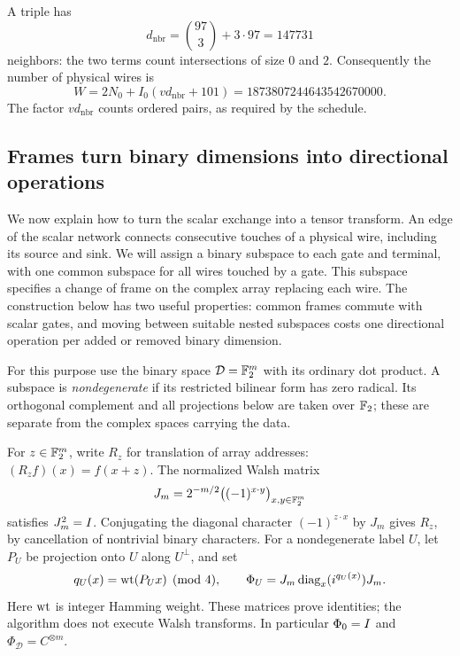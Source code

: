 A triple has
\[
 d_{\mathrm{nbr}}=\binom{97}{3}+3\cdot97=147731
\]
neighbors: the two terms count intersections of size $0$ and $2$.
Consequently the number of physical wires is
\begin{equation}\label{net:wire-count}
 W=2N_0+I_0(vd_{\mathrm{nbr}}+101)
   =1873807244643542670000.
\end{equation}
The factor $vd_{\mathrm{nbr}}$ counts ordered pairs, as required by
the schedule.

\subsection{Frames turn binary dimensions into directional operations}

We now explain how to turn the scalar exchange into a tensor transform.
An edge of the scalar network connects consecutive touches of a physical
wire, including its source and sink.  We will assign a binary subspace
to each gate and terminal, with one common subspace for all wires touched
by a gate.  This subspace specifies a change of frame on the complex
array replacing each wire.  The construction below has two useful
properties: common frames commute with scalar gates, and moving between
suitable nested subspaces costs one directional operation per added or
removed binary dimension.

For this purpose use the binary space $\mathcal D=\mathbb F_2^m$ with its
ordinary dot product.  A subspace is \emph{nondegenerate} if its restricted
bilinear form has zero radical.  Its orthogonal complement and all
projections below are taken over $\mathbb F_2$; these are separate from the
complex spaces carrying the data.

For $z\in\mathbb F_2^m$, write $R_z$ for translation of array addresses:
$(R_zf)(x)=f(x+z)$.  The normalized Walsh matrix
\[
 J_m=2^{-m/2}\bigl((-1)^{x\cdot y}\bigr)_{x,y\in\mathbb F_2^m}
\]
satisfies $J_m^2=I$.  Conjugating the diagonal character
$(-1)^{z\cdot x}$ by $J_m$ gives $R_z$, by cancellation of
nontrivial binary characters.  For a nondegenerate label $U$, let
$P_U$ be projection onto $U$ along $U^\perp$, and set
\begin{equation}\label{net:frame}
 q_U(x)=\operatorname{wt}(P_Ux)\pmod4,\qquad
 \Phi_U=J_m\operatorname{diag}_x(i^{q_U(x)})J_m.
\end{equation}
Here $\operatorname{wt}$ is integer Hamming weight.  These matrices prove
identities; the algorithm does not execute Walsh transforms.
In particular $\Phi_0=I$ and $\Phi_{\mathcal D}=C^{\otimes m}$.

